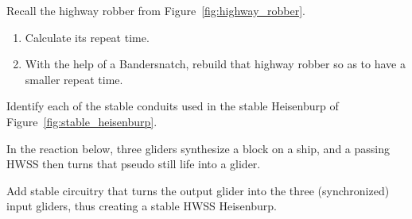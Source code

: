 \begin{multicols}{2}
	
	\mfilbreak
	
	
	\begin{problem}\label{exer:better_highway_robber_bandersnatch}
		Recall the highway robber from Figure~\ref{fig:highway_robber}.\smallskip
		
		\begin{enumerate}[label=\bf\color{ocre}(\alph*)]
			\item {} Calculate its repeat time.
			
			\item {} With the help of a Bandersnatch, rebuild that highway robber so as to have a smaller repeat time.
		\end{enumerate}
	\end{problem}


	\mfilbreak
	
	
	\begin{problemstar}\label{exer:stable_heisenburp_break_apart} 
		Identify each of the stable conduits used in the stable Heisenburp of Figure~\ref{fig:stable_heisenburp}.
		
	\end{problemstar}


	\mfilbreak
	
	
	\begin{problem}\label{exer:create_hwss_heisenburp} 
		In the reaction below, three gliders synthesize a block on a ship, and a passing HWSS then turns that pseudo still life into a glider.
		
		\begin{center}
		\end{center}
	
		\noindent Add stable circuitry that turns the output glider into the three (synchronized) input gliders, thus creating a stable HWSS Heisenburp.
	\end{problem}
	

\end{multicols}
